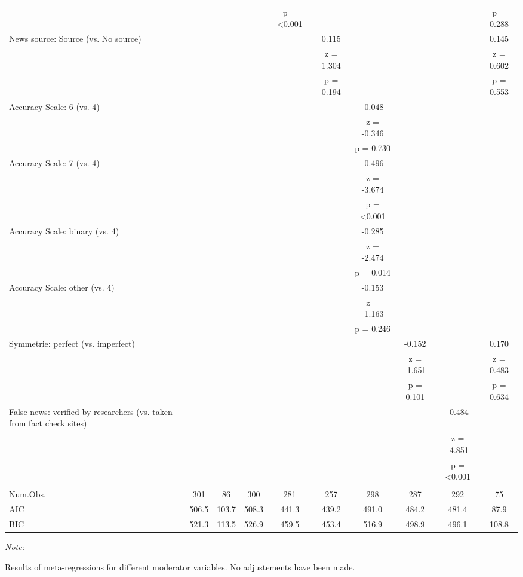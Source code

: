 \documentclass[
  man]{apa6}
\begin{document}
\begin{table}
{\begin{threeparttable}
\begin{tabular}[t]{lccccccccc}
 &  &  &  & p = <0.001 &  &  &  &  & p = 0.288\\
News source: Source (vs. No source) &  &  &  &  & 0.115 &  &  &  & 0.145\\
 &  &  &  &  & z = 1.304 &  &  &  & z = 0.602\\
 &  &  &  &  & p = 0.194 &  &  &  & p = 0.553\\
Accuracy Scale: 6 (vs. 4) &  &  &  &  &  & -0.048 &  &  & \\
 &  &  &  &  &  & z = -0.346 &  &  & \\
 &  &  &  &  &  & p = 0.730 &  &  & \\
Accuracy Scale: 7 (vs. 4) &  &  &  &  &  & -0.496 &  &  & \\
 &  &  &  &  &  & z = -3.674 &  &  & \\
 &  &  &  &  &  & p = <0.001 &  &  & \\
Accuracy Scale: binary (vs. 4) &  &  &  &  &  & -0.285 &  &  & \\
 &  &  &  &  &  & z = -2.474 &  &  & \\
 &  &  &  &  &  & p = 0.014 &  &  & \\
Accuracy Scale: other (vs. 4) &  &  &  &  &  & -0.153 &  &  & \\
 &  &  &  &  &  & z = -1.163 &  &  & \\
 &  &  &  &  &  & p = 0.246 &  &  & \\
Symmetrie: perfect (vs. imperfect) &  &  &  &  &  &  & -0.152 &  & 0.170\\
 &  &  &  &  &  &  & z = -1.651 &  & z = 0.483\\
 &  &  &  &  &  &  & p = 0.101 &  & p = 0.634\\
False news: verified by researchers (vs. taken from fact check sites) &  &  &  &  &  &  &  & -0.484 & \\
 &  &  &  &  &  &  &  & z = -4.851 & \\
 &  &  &  &  &  &  &  & p = <0.001 & \\
\midrule\\
Num.Obs. & 301 & 86 & 300 & 281 & 257 & 298 & 287 & 292 & 75\\
AIC & 506.5 & 103.7 & 508.3 & 441.3 & 439.2 & 491.0 & 484.2 & 481.4 & 87.9\\
BIC & 521.3 & 113.5 & 526.9 & 459.5 & 453.4 & 516.9 & 498.9 & 496.1 & 108.8\\
\bottomrule
\end{tabular}
\begin{tablenotes}
\item \textit{Note: } 
\item Results of meta-regressions for different moderator variables. No adjustements have been made.
\end{tablenotes}
\end{threeparttable}}
\end{table}
\end{document}
